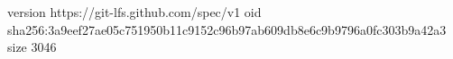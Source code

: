 version https://git-lfs.github.com/spec/v1
oid sha256:3a9eef27ae05c751950b11c9152c96b97ab609db8e6c9b9796a0fc303b9a42a3
size 3046
